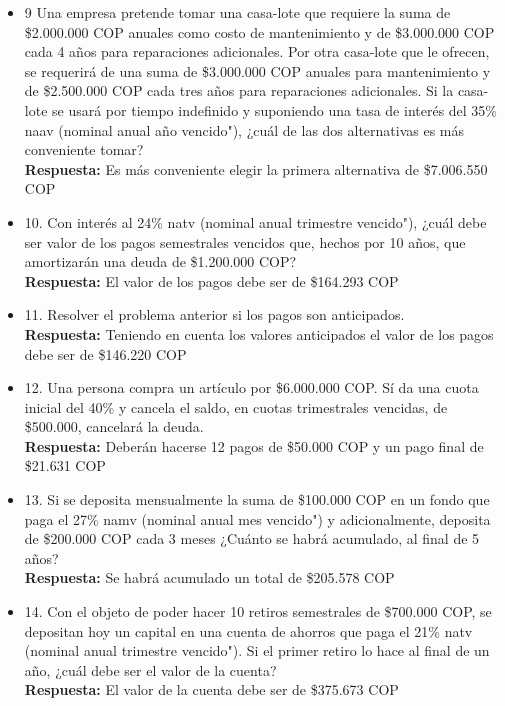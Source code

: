 \begin{itemize}
 \item 9 Una empresa pretende tomar una casa-lote que requiere la suma de \$2.000.000 COP anuales como costo de mantenimiento y de \$3.000.000 COP cada 4 años para reparaciones adicionales. Por otra casa-lote que le ofrecen, se requerirá de una suma de \$3.000.000 COP anuales para mantenimiento y de \$2.500.000 COP cada tres años para reparaciones adicionales. Si la casa-lote se usará por tiempo indefinido y suponiendo una tasa de interés del 35\% naav (nominal anual año vencido"), ¿cuál de las dos alternativas es más conveniente tomar?\\
       \textbf{Respuesta:} Es más conveniente elegir la primera alternativa de \$7.006.550 COP\\
       \medskip

 \item 10. Con interés al 24\%  natv (nominal anual trimestre vencido"), ¿cuál debe ser valor de los pagos semestrales vencidos que, hechos por 10 años, que amortizarán una deuda de \$1.200.000 COP?\\
       \textbf{Respuesta:} El valor de los pagos debe ser de \$164.293 COP\\
       \medskip

 \item 11. Resolver el problema anterior si los pagos son anticipados.\\
       \textbf{Respuesta:} Teniendo en cuenta los valores anticipados el valor de los pagos debe ser de \$146.220 COP\\
       \medskip

 \item 12. Una persona compra un artículo por \$6.000.000 COP. Sí da una cuota inicial del 40\% y cancela el saldo, en cuotas trimestrales vencidas, de \$500.000, cancelará la deuda.\\
      \textbf{Respuesta:} Deberán hacerse 12 pagos de \$50.000 COP y un pago final de \$21.631 COP\\
       \medskip

 \item 13. Si se deposita mensualmente la suma de \$100.000 COP en un fondo que paga el 27\%  namv (nominal anual mes vencido")  y adicionalmente, deposita de \$200.000 COP cada 3 meses ¿Cuánto se habrá acumulado, al final de 5 años?\\
      \textbf{Respuesta:} Se habrá acumulado un total de \$205.578 COP\\
       \medskip

 \item 14. Con  el objeto de poder hacer 10 retiros semestrales de \$700.000 COP, se depositan hoy un capital en una cuenta de ahorros que paga el 21\%  natv (nominal anual trimestre vencido"). Si el primer retiro lo hace al final de un año, ¿cuál debe ser el valor de la cuenta?\\
      \textbf{Respuesta:} El valor de la cuenta debe ser de \$375.673 COP\\
       \medskip


\end{itemize}
